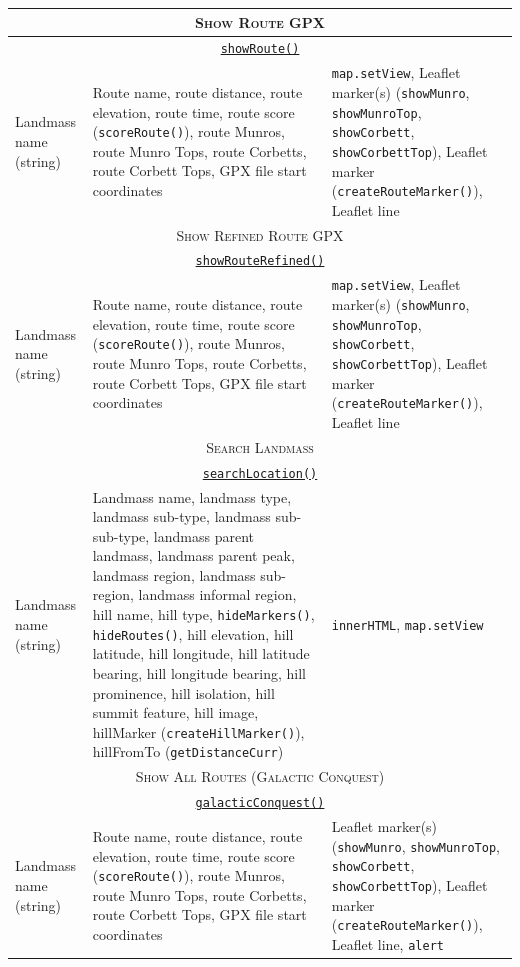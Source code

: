 \documentclass[11pt, english]{article}
\begin{document}
\begin{center}
\begin{longtable}{p{4cm}p{6cm}p{2cm}}
		\hline
		\multicolumn{3}{c}{\textsc{Show Route GPX}}\\
		\hline
		\multicolumn{3}{c}{\underline{\texttt{showRoute()}}}\\
		Landmass name (string) & Route name, route distance, route elevation, route time, route score (\texttt{scoreRoute()}), route Munros, route Munro Tops, route Corbetts, route Corbett Tops, GPX file start coordinates & \texttt{map.setView}, Leaflet marker(s) (\texttt{showMunro}, \texttt{showMunroTop}, \texttt{showCorbett}, \texttt{showCorbettTop}), Leaflet marker (\texttt{createRouteMarker()}), Leaflet line\\
		\hline
		\multicolumn{3}{c}{\textsc{Show Refined Route GPX}}\\
		\hline
		\multicolumn{3}{c}{\underline{\texttt{showRouteRefined()}}}\\
		Landmass name (string) & Route name, route distance, route elevation, route time, route score (\texttt{scoreRoute()}), route Munros, route Munro Tops, route Corbetts, route Corbett Tops, GPX file start coordinates & \texttt{map.setView}, Leaflet marker(s) (\texttt{showMunro}, \texttt{showMunroTop}, \texttt{showCorbett}, \texttt{showCorbettTop}), Leaflet marker (\texttt{createRouteMarker()}), Leaflet line\\
		\hline
		\multicolumn{3}{c}{\textsc{Search Landmass}}\\
		\hline
		\multicolumn{3}{c}{\underline{\texttt{searchLocation()}}}\\
		Landmass name (string) & Landmass name, landmass type, landmass sub-type, landmass sub-sub-type, landmass parent landmass, landmass parent peak, landmass region, landmass sub-region, landmass informal region, hill name, hill type, \texttt{hideMarkers()}, \texttt{hideRoutes()}, hill elevation, hill latitude, hill longitude, hill latitude bearing, hill longitude bearing, hill prominence, hill isolation, hill summit feature, hill image, hillMarker (\texttt{createHillMarker()}), hillFromTo (\texttt{getDistanceCurr}) & \texttt{innerHTML}, \texttt{map.setView}\\
		\hline
		\multicolumn{3}{c}{\textsc{Show All Routes (Galactic Conquest)}}\\
		\hline
		\multicolumn{3}{c}{\underline{\texttt{galacticConquest()}}}\\
		Landmass name (string) & Route name, route distance, route elevation, route time, route score (\texttt{scoreRoute()}), route Munros, route Munro Tops, route Corbetts, route Corbett Tops, GPX file start coordinates & Leaflet marker(s) (\texttt{showMunro}, \texttt{showMunroTop}, \texttt{showCorbett}, \texttt{showCorbettTop}), Leaflet marker (\texttt{createRouteMarker()}), Leaflet line, \texttt{alert}\\

\end{longtable}
\end{center}
\end{document}
